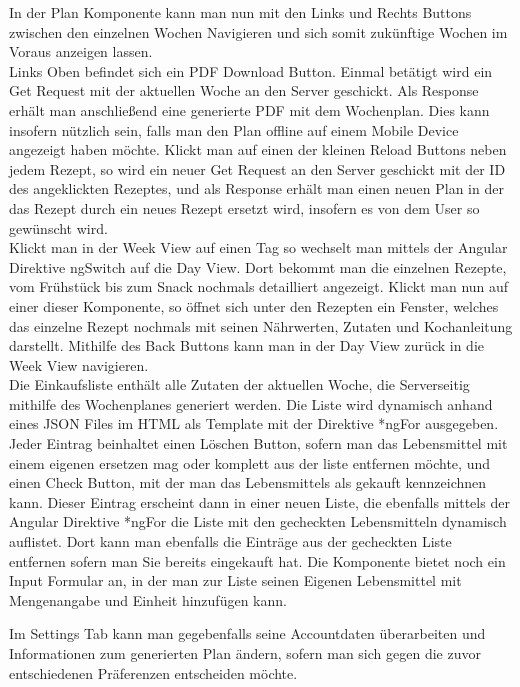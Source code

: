 In der Plan Komponente kann man nun mit den Links und Rechts Buttons zwischen den einzelnen Wochen Navigieren und sich somit zukünftige Wochen im Voraus anzeigen lassen.\\


Links Oben befindet sich ein PDF Download Button. Einmal betätigt wird ein Get Request mit der aktuellen Woche an den Server geschickt. Als Response erhält man anschließend eine generierte PDF mit dem Wochenplan. Dies kann insofern nützlich sein, falls man den Plan offline auf einem Mobile Device angezeigt haben möchte. Klickt man auf einen der kleinen Reload Buttons neben jedem Rezept, so wird ein neuer Get Request an den Server geschickt mit der ID des angeklickten Rezeptes, und als Response erhält man einen neuen Plan in der das Rezept durch ein neues Rezept ersetzt wird, insofern es von dem User so gewünscht wird.\\


Klickt man in der Week View auf einen Tag so wechselt man mittels der Angular Direktive ngSwitch auf die Day View. Dort bekommt man die einzelnen Rezepte, vom Frühstück bis zum Snack nochmals detailliert angezeigt. Klickt man nun auf einer dieser Komponente, so öffnet sich unter den Rezepten ein Fenster, welches das einzelne Rezept nochmals mit seinen Nährwerten, Zutaten und Kochanleitung darstellt. Mithilfe des Back Buttons kann man in der Day View zurück in die Week View navigieren.\\


Die Einkaufsliste enthält alle Zutaten der aktuellen Woche, die Serverseitig mithilfe des Wochenplanes generiert werden. Die Liste wird dynamisch anhand eines JSON Files im HTML als Template mit der Direktive *ngFor ausgegeben. Jeder Eintrag beinhaltet einen Löschen Button, sofern man das Lebensmittel mit einem eigenen ersetzen mag oder komplett aus der liste entfernen möchte, und einen Check Button, mit der man das Lebensmittels als gekauft kennzeichnen kann. Dieser Eintrag erscheint dann in einer neuen Liste, die ebenfalls mittels der Angular Direktive *ngFor die Liste mit den gecheckten Lebensmitteln dynamisch auflistet. Dort kann man ebenfalls die Einträge aus der gecheckten Liste entfernen sofern man Sie bereits eingekauft hat. Die Komponente bietet noch ein Input Formular an, in der man zur Liste seinen Eigenen Lebensmittel mit Mengenangabe und Einheit hinzufügen kann. 


Im Settings Tab kann man gegebenfalls seine Accountdaten überarbeiten und Informationen zum generierten Plan ändern, sofern man sich gegen die zuvor entschiedenen Präferenzen entscheiden möchte.
